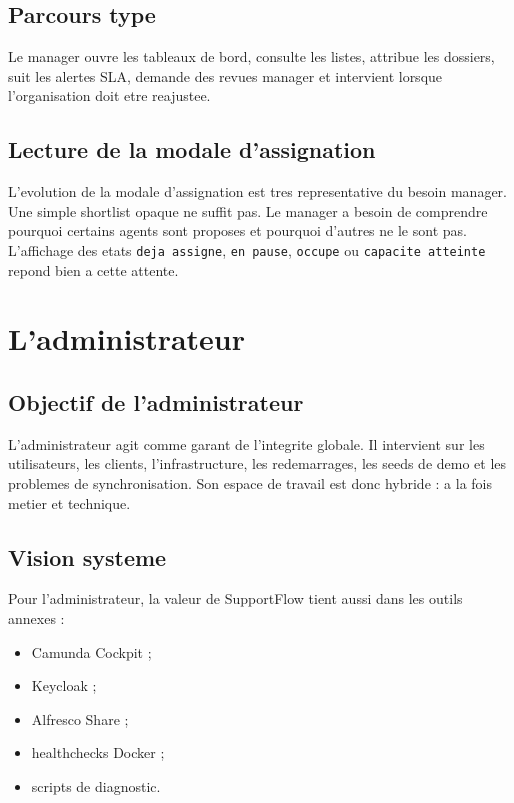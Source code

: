 \documentclass[12pt,a4paper,oneside]{report}
\begin{document}
\subsection{Parcours type}

Le manager ouvre les tableaux de bord, consulte les listes, attribue les dossiers, suit les alertes SLA, demande des revues manager et intervient lorsque l'organisation doit etre reajustee.

\subsection{Lecture de la modale d'assignation}

L'evolution de la modale d'assignation est tres representative du besoin manager. Une simple shortlist opaque ne suffit pas. Le manager a besoin de comprendre pourquoi certains agents sont proposes et pourquoi d'autres ne le sont pas. L'affichage des etats \texttt{deja assigne}, \texttt{en pause}, \texttt{occupe} ou \texttt{capacite atteinte} repond bien a cette attente.

\section{L'administrateur}

\subsection{Objectif de l'administrateur}

L'administrateur agit comme garant de l'integrite globale. Il intervient sur les utilisateurs, les clients, l'infrastructure, les redemarrages, les seeds de demo et les problemes de synchronisation. Son espace de travail est donc hybride : a la fois metier et technique.

\subsection{Vision systeme}

Pour l'administrateur, la valeur de SupportFlow tient aussi dans les outils annexes :

\begin{itemize}[leftmargin=1.2cm]
  \item Camunda Cockpit ;
  \item Keycloak ;
  \item Alfresco Share ;
  \item healthchecks Docker ;
  \item scripts de diagnostic.
\end{itemize}
\end{document}
